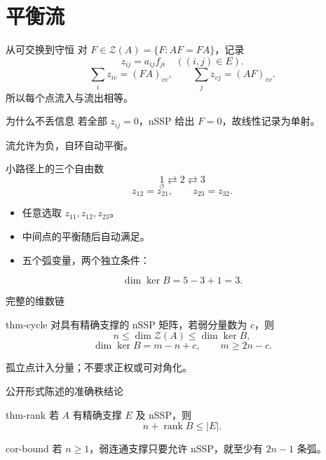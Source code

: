 \documentclass{beamer}
\begin{document}
\section{平衡流}
\begin{frame}{从可交换到守恒}
对 $F\in\mathcal Z(A)=\{F:AF=FA\}$，记录
\[
 z_{ij}=a_{ij}f_{ji}\quad ((i,j)\in E).
\]
\[
 \sum_i z_{iv}=(FA)_{vv},\qquad
 \sum_j z_{vj}=(AF)_{vv}.
\]
所以每个点流入与流出相等。
\begin{block}{为什么不丢信息}
若全部 $z_{ij}=0$，nSSP 给出 $F=0$，故线性记录为单射。
\end{block}
\small 流允许为负，自环自动平衡。
\end{frame}
\begin{frame}{小路径上的三个自由数}
\[
 \underset{\circlearrowleft}{1}\rightleftarrows2\rightleftarrows3
\]
\[
 z_{12}=z_{21},\qquad z_{23}=z_{32}.
\]
\begin{itemize}
\item 任意选取 $z_{11},z_{12},z_{23}$。
\item 中间点的平衡随后自动满足。
\item 五个弧变量，两个独立条件：
\end{itemize}
\[
 \dim\ker B=5-3+1=3.
\]
\end{frame}
\begin{frame}{完整的维数链}
\begin{bookresult}{thm-cycle}
对具有精确支撑的 nSSP 矩阵，若弱分量数为 $c$，则
\[
 n\leq\dim\mathcal Z(A)\leq\dim\ker B,
\]
\[
 \dim\ker B=m-n+c,\qquad m\geq2n-c.
\]
\end{bookresult}
\small 孤立点计入分量；不要求正权或可对角化。
\end{frame}
\begin{frame}{公开形式陈述的准确秩结论}
\begin{bookresult}{thm-rank}
若 $A$ 有精确支撑 $E$ 及 nSSP，则
\[
 n+\operatorname{rank}B\leq |E|.
\]
\end{bookresult}
\begin{bookresult}{cor-bound}
若 $n\geq1$，弱连通支撑只要允许 nSSP，就至少有 $2n-1$ 条弧。
\end{bookresult}
\end{frame}
\end{document}
